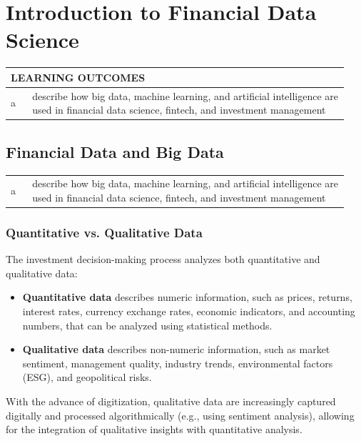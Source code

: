 \chapter{Introduction to Financial Data Science}
\label{chap:Introduction to Financial Data Science}

\begin{center}
\begin{tabular}{p{0.06\linewidth} | p{0.88\linewidth}}
	\toprule
	\multicolumn{2}{l}{\textbf{LEARNING OUTCOMES}} \\
	\midrule
	a & describe how big data, machine learning, and artificial intelligence are used in financial data science, fintech, and investment management \\
	\bottomrule
\end{tabular}
\end{center}

\section{Financial Data and Big Data}
\label{sec:Financial Data and Big Data}

\begin{center}
\begin{tabular}{p{0.06\linewidth} | p{0.88\linewidth}}
	a & describe how big data, machine learning, and artificial intelligence are used in financial data science, fintech, and investment management \\
\end{tabular}
\end{center}

\subsection{Quantitative vs. Qualitative Data}
The investment decision-making process analyzes both quantitative and qualitative data:
\begin{itemize}[noitemsep, topsep=2pt, parsep=0pt]
	\item \textbf{Quantitative data} describes numeric information, such as prices, returns, interest rates, currency exchange rates, economic indicators, and accounting numbers, that can be analyzed using statistical methods.
	\item \textbf{Qualitative data} describes non-numeric information, such as market sentiment, management quality, industry trends, environmental factors (ESG), and geopolitical risks.
\end{itemize}
With the advance of digitization, qualitative data are increasingly captured digitally and processed algorithmically (e.g., using sentiment analysis), allowing for the integration of qualitative insights with quantitative analysis.

